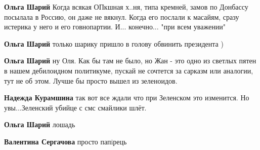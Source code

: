\begin{itemize}
\begin{itemize}
\textbf{Ольга Шарий} Когда всякая ОПкшная х..ня, типа кремней, замов по
Донбассу посылала в Россию, он даже не вякнул. Когда его послали к масайям,
сразу истерика у него и его говнопартии. И... конечно... "при всем уважении"

 
\textbf{Ольга Шарий} только шарику пришло в голову обвинить президента )

 
\textbf{Ольга Шарий} ну Оля. Как бы там не было, но Жан - это одно из светлых пятен в нашем дебилоидном политикуме, пускай не сочтется за сарказм или аналогии, тут не об этом. Лучше бы просто вышел из зеленоидов.

 
\textbf{Надежда Курамшина} так вот все ждали что при Зеленском это изменится. Но увы...Зеленский убийце с смс смайлики шлёт.

 
\textbf{Ольга Шарий} лошадь

 
\textbf{Валентина Сергачова} просто папiрець

 

\end{itemize}
\end{itemize}
